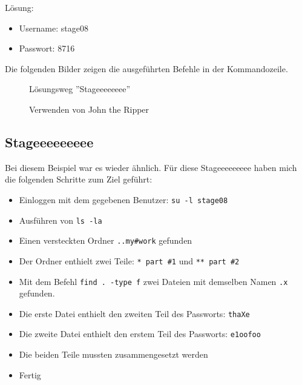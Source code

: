 \documentclass[12pt, a4paper, titlepage, oneside]{scrartcl}
\begin{document}
	Lösung:
	\begin{itemize}
		\item Username: stage08

		\item Passwort: 8716
	\end{itemize}

	Die folgenden Bilder zeigen die ausgeführten Befehle in der Kommandozeile.

	\begin{figure}[h!]
		\centering
		\caption{Lösungsweg ''Stageeeeeeee''}
		\label{fig:stageeeeeeee_solution}
	\end{figure}
	\begin{figure}[h!]
		\centering
		\caption{Verwenden von John the Ripper}
		\label{fig:stageeeeeeee_john-the-ripper}
	\end{figure}

	\newpage

	\subsection{Stageeeeeeeee}
	Bei diesem Beispiel war es wieder ähnlich. Für diese Stageeeeeeeee haben mich
	die folgenden Schritte zum Ziel geführt:

	\begin{itemize}
		\item Einloggen mit dem gegebenen Benutzer: \lstinline{su -l stage08}

		\item Ausführen von \lstinline{ls -la}

		\item Einen versteckten Ordner \lstinline{..my#work} gefunden

		\item Der Ordner enthielt zwei Teile: \lstinline{* part #1} und \lstinline{** part #2}

		\item Mit dem Befehl \lstinline{find . -type f} zwei Dateien mit demselben
			Namen \lstinline{.x} gefunden.

		\item Die erste Datei enthielt den zweiten Teil des Passworts: \lstinline{thaXe}

		\item Die zweite Datei enthielt den erstem Teil des Passworts: \lstinline{e1oofoo}

		\item Die beiden Teile mussten zusammengesetzt werden

		\item Fertig
	\end{itemize}
\end{document}
